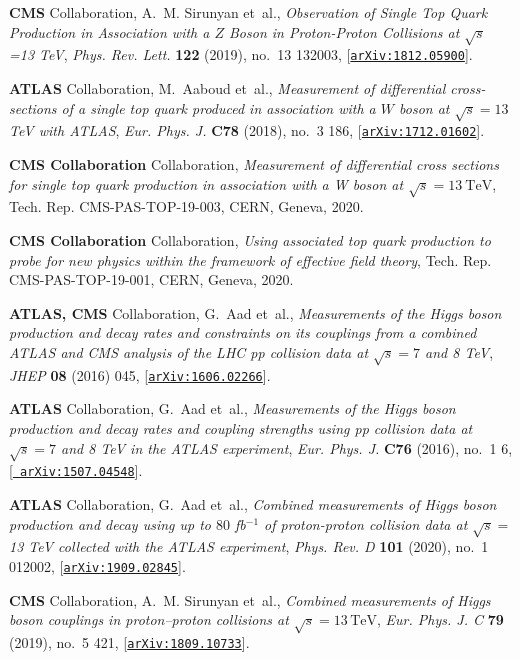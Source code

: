\documentclass[11pt,a4paper]{article}
\numberwithin{equation}{section}
\numberwithin{figure}{section}
\numberwithin{table}{section}
\begin{document}
\begin{thebibliography}{100}
{\bf CMS} Collaboration, A.~M. Sirunyan et~al., {\it {Observation of Single Top
  Quark Production in Association with a $Z$ Boson in Proton-Proton Collisions
  at $\sqrt {s}$ =13 TeV}},  {\em Phys. Rev. Lett.} {\bf 122} (2019), no.~13
  132003, [\href{http://arxiv.org/abs/1812.05900}{{\tt arXiv:1812.05900}}].

{\bf ATLAS} Collaboration, M.~Aaboud et~al., {\it {Measurement of differential
  cross-sections of a single top quark produced in association with a $W$ boson
  at $\sqrt{s}=13$ TeV with ATLAS}},  {\em Eur. Phys. J.} {\bf C78} (2018),
  no.~3 186, [\href{http://arxiv.org/abs/1712.01602}{{\tt arXiv:1712.01602}}].

{\bf CMS Collaboration} Collaboration, {\it {Measurement of differential cross
  sections for single top quark production in association with a W boson at
  $\sqrt{s}=13~\mathrm{TeV}$}},  Tech. Rep. CMS-PAS-TOP-19-003, CERN, Geneva,
  2020.

{\bf CMS Collaboration} Collaboration, {\it {Using associated top quark
  production to probe for new physics within the framework of effective field
  theory}},  Tech. Rep. CMS-PAS-TOP-19-001, CERN, Geneva, 2020.

{\bf ATLAS, CMS} Collaboration, G.~Aad et~al., {\it {Measurements of the Higgs
  boson production and decay rates and constraints on its couplings from a
  combined ATLAS and CMS analysis of the LHC pp collision data at $ \sqrt{s}=7
  $ and 8 TeV}},  {\em JHEP} {\bf 08} (2016) 045,
  [\href{http://arxiv.org/abs/1606.02266}{{\tt arXiv:1606.02266}}].

{\bf ATLAS} Collaboration, G.~Aad et~al., {\it {Measurements of the Higgs boson
  production and decay rates and coupling strengths using pp collision data at
  $\sqrt{s}=7$ and 8 TeV in the ATLAS experiment}},  {\em Eur. Phys. J.} {\bf
  C76} (2016), no.~1 6, [\href{http://arxiv.org/abs/1507.04548}{{\tt
  arXiv:1507.04548}}].

{\bf ATLAS} Collaboration, G.~Aad et~al., {\it {Combined measurements of Higgs
  boson production and decay using up to $80$ fb$^{-1}$ of proton-proton
  collision data at $\sqrt{s}=$ 13 TeV collected with the ATLAS experiment}},
  {\em Phys. Rev. D} {\bf 101} (2020), no.~1 012002,
  [\href{http://arxiv.org/abs/1909.02845}{{\tt arXiv:1909.02845}}].

{\bf CMS} Collaboration, A.~M. Sirunyan et~al., {\it {Combined measurements of
  Higgs boson couplings in proton--proton collisions at $\sqrt{s}=13\,\text
  {Te}\text {V} $}},  {\em Eur. Phys. J. C} {\bf 79} (2019), no.~5 421,
  [\href{http://arxiv.org/abs/1809.10733}{{\tt arXiv:1809.10733}}].


\end{thebibliography}
\end{document}
